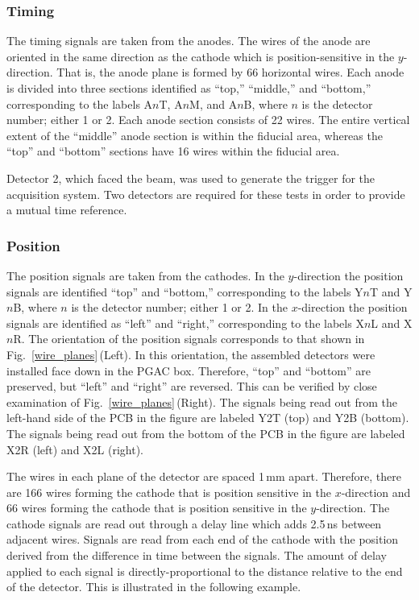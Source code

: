 \subsubsection{Timing}
The timing signals are taken from the anodes. %
The wires of the anode are oriented in the same direction as the cathode which is position-sensitive in the $y$-direction.  That is, the anode plane is formed by 66 horizontal wires.  Each anode is divided into three sections identified as ``top,'' ``middle,'' and ``bottom,'' corresponding to the labels A$n$T, A$n$M, and A$n$B, where $n$ is the detector number; either 1 or 2.  Each anode section consists of 22 wires.  The entire vertical extent of the ``middle'' anode section is within the fiducial area, whereas the ``top'' and ``bottom'' sections have 16 wires within the fiducial area.

Detector 2, which faced the beam, was used to generate the trigger for the acquisition system.  Two detectors are required for these tests in order to provide a mutual time reference.
\subsubsection{Position}
\label{position_description}
The position signals are taken from the cathodes. In the $y$-direction the position signals are identified ``top'' and ``bottom,'' corresponding to the labels Y$n$T and Y$n$B, where $n$ is the detector number; either 1 or 2. In the $x$-direction the position signals are identified as ``left'' and ``right,'' corresponding to the labels X$n$L and X$n$R. The orientation of the position signals corresponds to that shown in Fig.~\ref{wire_planes}\,(Left).  In this orientation, the assembled detectors were installed face down in the PGAC box.  Therefore, ``top'' and ``bottom'' are preserved, but ``left'' and ``right'' are reversed.  This can be verified by close examination of Fig.~\ref{wire_planes}\,(Right).  The signals being read out from the left-hand side of the PCB in the figure are labeled Y2T (top) and Y2B (bottom).  The signals being read out from the bottom of the PCB in the figure are labeled X2R (left) and X2L (right).

The wires in each plane of the detector are spaced 1\,mm apart.  Therefore, there are 166 wires forming the cathode that is position sensitive in the $x$-direction and 66 wires forming the cathode that is position sensitive in the $y$-direction.  The cathode signals are read out through a delay line which adds 2.5\,ns between adjacent wires.  Signals are read from each end of the cathode with the position derived from the difference in time between the signals.  The amount of delay applied to each signal is directly-proportional to the distance relative to the end of the detector.  This is illustrated in the following example.  

